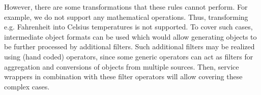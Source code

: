 However, there are some transformations that these rules cannot perform. For example, we do not support any mathematical operations. Thus, transforming e.g. Fahrenheit into Celsius temperatures is not supported. To cover such  cases, intermediate object formats can be used which would allow generating objects to be further processed by additional filters. Such additional filters may be realized using (hand coded) operators, since some generic operators can act as filters for aggregation and conversions of objects from multiple sources. Then, service wrappers in combination with these filter operators will allow covering these complex cases.



